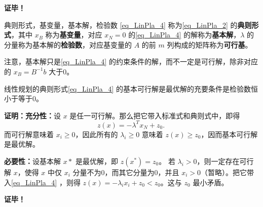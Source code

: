 \textbf{证毕！}

\begin{definition}{典则形式，基变量，基本解，检验数}
\autoref{eq_LinPla_4} 称为\autoref{eq_LinPla_2} 的\textbf{典则形式}，其中 $x_B$ 称为\textbf{基变量}，对应 $x_N=0$ 的\autoref{eq_LinPla_4} 的解称为\textbf{基本解}，$\lambda$ 的分量称为基本解的\textbf{检验数}，对应基变量的 $A$ 的前 $m$ 列构成的矩阵称为\textbf{可行基}。 
\end{definition}
注意，基本解只是\autoref{eq_LinPla_4} 的约束条件的解，而不一定是可行解，除非对应的 $x_B=B^{-1}b$ 大于0。 
\begin{corollary}{}
线性规划的典则形式\autoref{eq_LinPla_4} 的基本可行解是最优解的充要条件是检验数恒小于等于0。
\end{corollary}
\textbf{证明：}\textbf{充分性：}设 $x$ 是任一可行解。那么把它带入标准式和典则式中，即得 
\begin{equation}
z(x)=-\lambda^T x_N+z_0.~
\end{equation}
而可行解意味着 $x_i\geq0$，因此所有的 $\lambda_i\geq0$ 意味着 $z(x)\geq z_0$，因而基本可行解是最优解。


\textbf{必要性：}设基本解 $x*$ 是最优解，即 $z(x^*)=z_0$。 若 $\lambda_i>0$，则一定存在可行解 $x$，使得 $x$ 中仅 $x_i$ 分量不为0，而其它分量为0，并且 $x_i>0$（暂略）。把它带入\autoref{eq_LinPla_4} ，则得 $z(x)=-\lambda_ix_i+z_0< z_0$。这与 $z_0$ 最小矛盾。


\textbf{证毕！}




